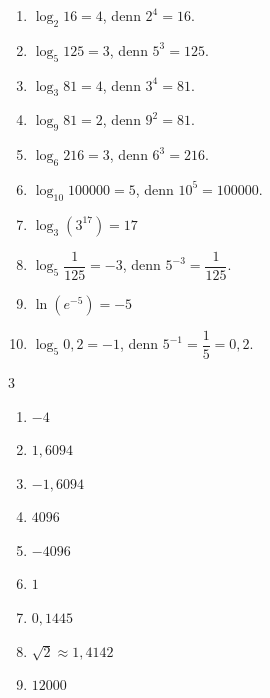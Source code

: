 \begin{enumerate}[label=\alph*)]
  \item $\log_2 16 = 4$, denn $2^4 = 16$.
  \item $\log_5 125 = 3$, denn $5^3 = 125$.
  \item $\log_3 81 = 4$, denn $3^4 = 81$.
  \item $\log_9 81 = 2$, denn $9^2 = 81$.
  \item $\log_6 216 = 3$, denn $6^3 = 216$.
  \item $\log_{10} 100000 = 5$, denn $10^5 = 100000$.
  \item $\log_3 (3^{17}) = 17$
  \item $\log_5 \dfrac{1}{125} = -3$, denn $5^{-3} = \dfrac{1}{125}$.
  \item $\ln(e^{-5}) = -5$
  \item $\log_5 0{,}2 = -1$, denn $5^{-1} = \dfrac{1}{5} = 0{,}2$.
\end{enumerate}

\begin{multicols}{3}
\begin{enumerate}[label=\alph*)]
  \item $-4$
  \item $1{,}6094$
  \item $-1{,}6094$
  \item $4096$
  \item $-4096$
  \item $1$
  \item $0{,}1445$
  \item $\sqrt{2} \approx 1{,}4142$
  \item $12000$
\end{enumerate}
\end{multicols}
